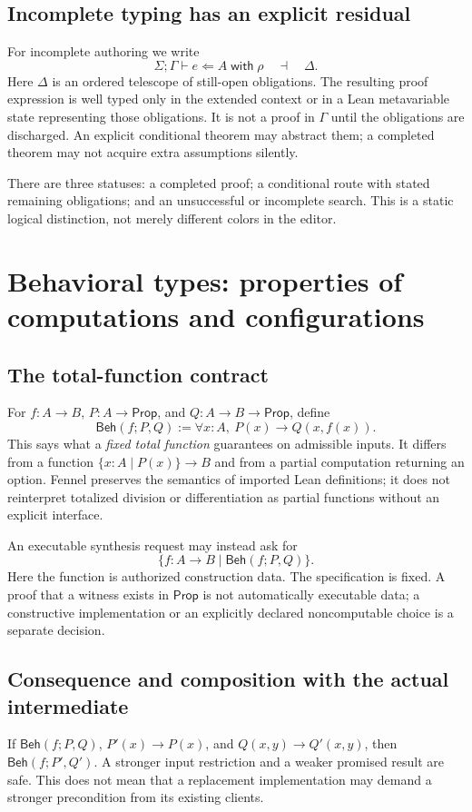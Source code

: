 \documentclass[11pt,a4paper]{article}
\theoremstyle{definition}
\theoremstyle{remark}
\newcommand{\Prop}{\mathsf{Prop}}
\newcommand{\Beh}{\mathsf{Beh}}
\begin{document}
\subsection{Incomplete typing has an explicit residual}
For incomplete authoring we write
\[
 \Sigma;\Gamma\vdash e\Leftarrow A\;\mathsf{with}\;\rho
 \quad\dashv\quad\Delta.
\]
Here $\Delta$ is an ordered telescope of still-open obligations. The resulting
proof expression is well typed only in the extended context or in a Lean
metavariable state representing those obligations. It is not a proof in
$\Gamma$ until the obligations are discharged. An explicit conditional theorem
may abstract them; a completed theorem may not acquire extra assumptions
silently.

There are three statuses: a completed proof; a conditional route with stated
remaining obligations; and an unsuccessful or incomplete search. This is a
static logical distinction, not merely different colors in the editor.

\section{Behavioral types: properties of computations and configurations}
\label{sec:behavior}

\subsection{The total-function contract}
For $f:A\to B$, $P:A\to\Prop$, and $Q:A\to B\to\Prop$, define
\[
 \Beh(f;P,Q):=\forall x:A,\ P(x)\to Q(x,f(x)).
\]
This says what a \emph{fixed total function} guarantees on admissible inputs.
It differs from a function $\{x:A\mid P(x)\}\to B$ and from a partial
computation returning an option. Fennel preserves the semantics of imported
Lean definitions; it does not reinterpret totalized division or differentiation
as partial functions without an explicit interface.

An executable synthesis request may instead ask for
\[
 \{f:A\to B\mid\Beh(f;P,Q)\}.
\]
Here the function is authorized construction data. The specification is fixed.
A proof that a witness exists in $\Prop$ is not automatically executable data;
a constructive implementation or an explicitly declared noncomputable choice
is a separate decision.

\subsection{Consequence and composition with the actual intermediate}
If $\Beh(f;P,Q)$, $P'(x)\to P(x)$, and $Q(x,y)\to Q'(x,y)$, then
$\Beh(f;P',Q')$. A stronger input restriction and a weaker promised result are
safe. This does not mean that a replacement implementation may demand a
stronger precondition from its existing clients.
\end{document}
